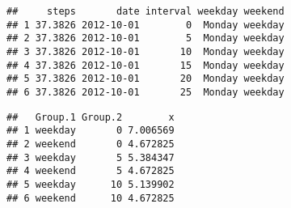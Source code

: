 \documentclass[]{article}
\newenvironment{Shaded}{\begin{snugshade}}{\end{snugshade}}
\newcommand{\KeywordTok}[1]{\textcolor[rgb]{0.13,0.29,0.53}{\textbf{#1}}}
\newcommand{\DataTypeTok}[1]{\textcolor[rgb]{0.13,0.29,0.53}{#1}}
\newcommand{\StringTok}[1]{\textcolor[rgb]{0.31,0.60,0.02}{#1}}
\newcommand{\OperatorTok}[1]{\textcolor[rgb]{0.81,0.36,0.00}{\textbf{#1}}}
\newcommand{\NormalTok}[1]{#1}
\begin{document}
\begin{Shaded}
\end{Shaded}

\begin{verbatim}
##     steps       date interval weekday weekend
## 1 37.3826 2012-10-01        0  Monday weekday
## 2 37.3826 2012-10-01        5  Monday weekday
## 3 37.3826 2012-10-01       10  Monday weekday
## 4 37.3826 2012-10-01       15  Monday weekday
## 5 37.3826 2012-10-01       20  Monday weekday
## 6 37.3826 2012-10-01       25  Monday weekday
\end{verbatim}

\begin{Shaded}
\end{Shaded}

\begin{verbatim}
##   Group.1 Group.2        x
## 1 weekday       0 7.006569
## 2 weekend       0 4.672825
## 3 weekday       5 5.384347
## 4 weekend       5 4.672825
## 5 weekday      10 5.139902
## 6 weekend      10 4.672825
\end{verbatim}
\end{document}
